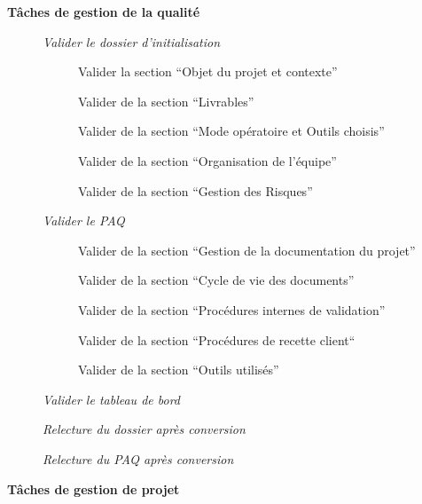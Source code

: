 \begin{description}
    \item[] \bf{Tâches de gestion de la qualité}
        \begin{description}
            \item[\textbullet] \it{Valider le dossier d’initialisation}
                \begin{description}
                    \item[\textbullet] Valider la section “Objet du projet et contexte”
                    \item[\textbullet] Valider de la section “Livrables”
                    \item[\textbullet] Valider de la section “Mode opératoire et Outils choisis”
                    \item[\textbullet] Valider de la section “Organisation de l’équipe”
                    \item[\textbullet] Valider de la section “Gestion des Risques”
                \end{description}
            \item[\textbullet] \it{Valider le PAQ}
                \begin{description}
                    \item[\textbullet] Valider de la section “Gestion de la documentation du projet”
                    \item[\textbullet] Valider de la section “Cycle de vie des documents”
                    \item[\textbullet] Valider de la section “Procédures internes de validation”
                    \item[\textbullet] Valider de la section “Procédures de recette client“
                    \item[\textbullet] Valider de la section “Outils utilisés”
                \end{description}
            \item[\textbullet] \it{Valider le tableau de bord}
            \item[\textbullet] \it{Relecture du dossier après conversion}
            \item[\textbullet] \it{Relecture du PAQ après conversion} \\
        \end{description}
    \item[] \bf{Tâches de gestion de projet}

\end{description}
